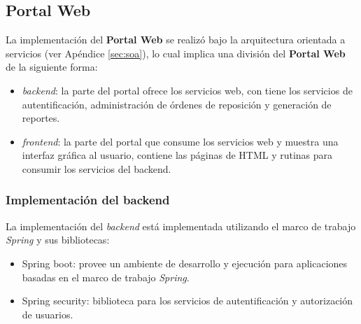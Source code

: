\subsection{Portal Web}\label{sec:web-portal}
La implementación del \textbf{Portal Web} se realizó bajo la arquitectura orientada a servicios (ver Apéndice \ref{sec:soa}), lo cual implica una división del \textbf{Portal Web} de la siguiente forma:
\begin{itemize}
	\item \textit{backend}: la parte del portal ofrece los servicios web, con tiene los servicios de autentificación, administración de órdenes de reposición y generación de reportes.
	\item \textit{frontend}: la parte del portal que consume los servicios web y muestra una interfaz gráfica al usuario, contiene las páginas de HTML y rutinas para consumir los servicios del backend.
\end{itemize}

\subsubsection{Implementación del backend}\label{sec:backend}
La implementación del \textit{backend} está implementada utilizando el marco de trabajo \textit{Spring} y sus bibliotecas:
\begin{itemize}
 	\item Spring boot: provee un ambiente de desarrollo y ejecución para aplicaciones basadas en el marco de trabajo \textit{Spring}. 
 	\item Spring security: biblioteca para los servicios de autentificación y autorización de usuarios.
\end{itemize}

